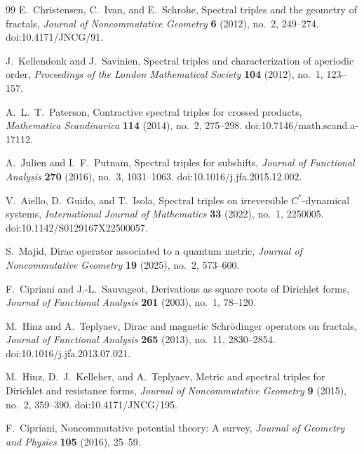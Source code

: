 \documentclass[11pt]{article}
\theoremstyle{definition}
\theoremstyle{remark}
\theoremstyle{definition}
\theoremstyle{remark}
\begin{document}
\begin{thebibliography}{99}
E.~Christensen, C.~Ivan, and E.~Schrohe,
\newblock Spectral triples and the geometry of fractals,
\newblock \emph{Journal of Noncommutative Geometry} \textbf{6} (2012), no.~2,
249--274.
\newblock doi:10.4171/JNCG/91.

J.~Kellendonk and J.~Savinien,
\newblock Spectral triples and characterization of aperiodic order,
\newblock \emph{Proceedings of the London Mathematical Society} \textbf{104} (2012),
no.~1, 123--157.

A.~L.~T.~Paterson,
\newblock Contractive spectral triples for crossed products,
\newblock \emph{Mathematica Scandinavica} \textbf{114} (2014), no.~2, 275--298.
\newblock doi:10.7146/math.scand.a-17112.

A.~Julien and I.~F.~Putnam,
\newblock Spectral triples for subshifts,
\newblock \emph{Journal of Functional Analysis} \textbf{270} (2016), no.~3,
1031--1063.
\newblock doi:10.1016/j.jfa.2015.12.002.

V.~Aiello, D.~Guido, and T.~Isola,
\newblock Spectral triples on irreversible $C^*$-dynamical systems,
\newblock \emph{International Journal of Mathematics} \textbf{33} (2022), no.~1,
2250005.
\newblock doi:10.1142/S0129167X22500057.

S.~Majid,
\newblock Dirac operator associated to a quantum metric,
\newblock \emph{Journal of Noncommutative Geometry} \textbf{19} (2025), no.~2,
573--600.

F.~Cipriani and J.-L.~Sauvageot,
\newblock Derivations as square roots of Dirichlet forms,
\newblock \emph{Journal of Functional Analysis} \textbf{201} (2003), no.~1,
78--120.

M.~Hinz and A.~Teplyaev,
\newblock Dirac and magnetic Schr\"odinger operators on fractals,
\newblock \emph{Journal of Functional Analysis} \textbf{265} (2013), no.~11,
2830--2854.
\newblock doi:10.1016/j.jfa.2013.07.021.

M.~Hinz, D.~J.~Kelleher, and A.~Teplyaev,
\newblock Metric and spectral triples for Dirichlet and resistance forms,
\newblock \emph{Journal of Noncommutative Geometry} \textbf{9} (2015), no.~2,
359--390.
\newblock doi:10.4171/JNCG/195.

F.~Cipriani,
\newblock Noncommutative potential theory: A survey,
\newblock \emph{Journal of Geometry and Physics} \textbf{105} (2016), 25--59.


\end{thebibliography}
\end{document}
